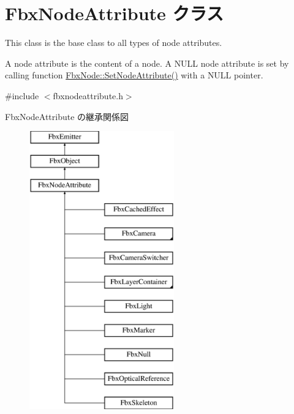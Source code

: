 \hypertarget{class_fbx_node_attribute}{}\section{Fbx\+Node\+Attribute クラス}
\label{class_fbx_node_attribute}


This class is the base class to all types of node attributes.

A node attribute is the content of a node. A {\ttfamily N\+U\+LL} node attribute is set by calling function \hyperlink{class_fbx_node_adb194a043dd1ccf3bc1e3bda520dc97a}{Fbx\+Node\+::\+Set\+Node\+Attribute()} with a {\ttfamily N\+U\+LL} pointer.  




{\ttfamily \#include $<$fbxnodeattribute.\+h$>$}

Fbx\+Node\+Attribute の継承関係図\begin{figure}[H]
\begin{center}
\leavevmode
\includegraphics[height=12.000000cm]{class_fbx_node_attribute}
\end{center}
\end{figure}
